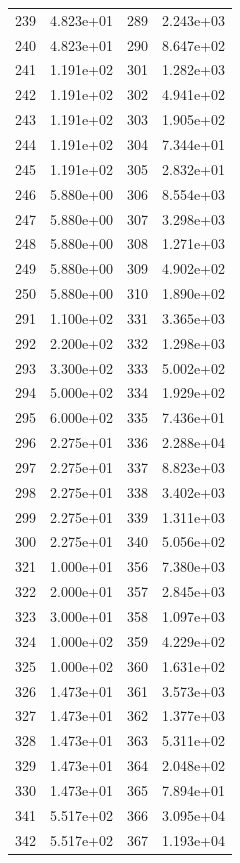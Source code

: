 \documentclass[12pt]{article}
\begin{document}
\begin{longtable}{@{}cccc@{}}
239 & 4.823e+01 & 289 & 2.243e+03 \\
240 & 4.823e+01 & 290 & 8.647e+02 \\
241 & 1.191e+02 & 301 & 1.282e+03 \\
242 & 1.191e+02 & 302 & 4.941e+02 \\
243 & 1.191e+02 & 303 & 1.905e+02 \\
244 & 1.191e+02 & 304 & 7.344e+01 \\
245 & 1.191e+02 & 305 & 2.832e+01 \\
246 & 5.880e+00 & 306 & 8.554e+03 \\
247 & 5.880e+00 & 307 & 3.298e+03 \\
248 & 5.880e+00 & 308 & 1.271e+03 \\
249 & 5.880e+00 & 309 & 4.902e+02 \\
250 & 5.880e+00 & 310 & 1.890e+02 \\
291 & 1.100e+02 & 331 & 3.365e+03 \\
292 & 2.200e+02 & 332 & 1.298e+03 \\
293 & 3.300e+02 & 333 & 5.002e+02 \\
294 & 5.000e+02 & 334 & 1.929e+02 \\
295 & 6.000e+02 & 335 & 7.436e+01 \\
296 & 2.275e+01 & 336 & 2.288e+04 \\
297 & 2.275e+01 & 337 & 8.823e+03 \\
298 & 2.275e+01 & 338 & 3.402e+03 \\
299 & 2.275e+01 & 339 & 1.311e+03 \\
300 & 2.275e+01 & 340 & 5.056e+02 \\
321 & 1.000e+01 & 356 & 7.380e+03 \\
322 & 2.000e+01 & 357 & 2.845e+03 \\
323 & 3.000e+01 & 358 & 1.097e+03 \\
324 & 1.000e+02 & 359 & 4.229e+02 \\
325 & 1.000e+02 & 360 & 1.631e+02 \\
326 & 1.473e+01 & 361 & 3.573e+03 \\
327 & 1.473e+01 & 362 & 1.377e+03 \\
328 & 1.473e+01 & 363 & 5.311e+02 \\
329 & 1.473e+01 & 364 & 2.048e+02 \\
330 & 1.473e+01 & 365 & 7.894e+01 \\
341 & 5.517e+02 & 366 & 3.095e+04 \\
342 & 5.517e+02 & 367 & 1.193e+04 \\

\end{longtable}
\end{document}
